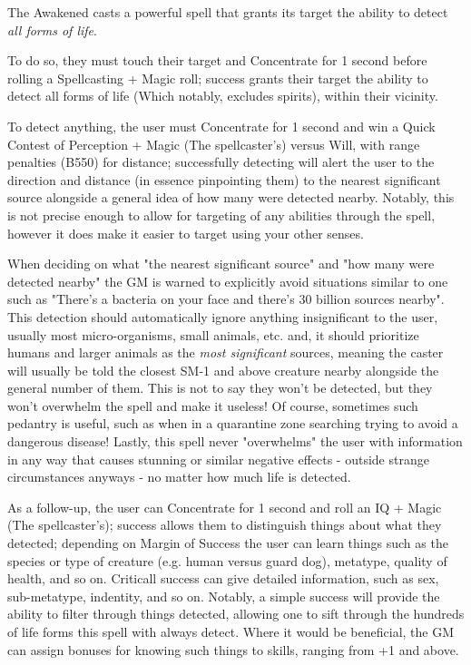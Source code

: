 \begin{multicols*}{3}
	The Awakened casts a powerful spell that grants its target the ability to detect \textit{all forms of life}.
	
	To do so, they must touch their target and Concentrate for 1 second before rolling a Spellcasting + Magic roll; success grants their target the ability to detect all forms of life (Which notably, excludes spirits), within their vicinity.
	
	To detect anything, the user must Concentrate for 1 second and win a Quick Contest of Perception + Magic (The spellcaster's) versus Will, with range penalties (B550) for distance; successfully detecting will alert the user to the direction and distance (in essence pinpointing them) to the nearest significant source alongside a general idea of how many were detected nearby. Notably, this is not precise enough to allow for targeting of any abilities through the spell, however it does make it easier to target using your other senses.
	
	When deciding on what "the nearest significant source" and "how many were detected nearby" the GM is warned to explicitly avoid situations similar to one such as "There's a bacteria on your face and there's 30 billion sources nearby". This detection should automatically ignore anything insignificant to the user, usually most micro-organisms, small animals, etc. and, it should prioritize humans and larger animals as the \textit{most significant} sources, meaning the caster will usually be told the closest SM-1 and above creature nearby alongside the general number of them. This is not to say they won't be detected, but they won't overwhelm the spell and make it useless! Of course, sometimes such pedantry is useful, such as when in a quarantine zone searching trying to avoid a dangerous disease! Lastly, this spell never "overwhelms" the user with information in any way that causes stunning or similar negative effects - outside strange circumstances anyways - no matter how much life is detected.
	
	As a follow-up, the user can Concentrate for 1 second and roll an IQ + Magic (The spellcaster's); success allows them to distinguish things about what they detected; depending on Margin of Success the user can learn things such as the species or type of creature (e.g. human versus guard dog), metatype, quality of health, and so on. Criticall success can give detailed information, such as sex, sub-metatype, indentity, and so on. Notably, a simple success will provide the ability to filter through things detected, allowing one to sift through the hundreds of life forms this spell with always detect. Where it would be beneficial, the GM can assign bonuses for knowing such things to skills, ranging from +1 and above.
	

\end{multicols*}
